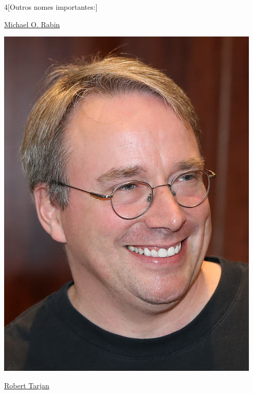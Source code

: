 \begin{multicols}{4}[Outros nomes importantes:]
\vfill\null
\columnbreak				
				
				\href{https://pt.wikipedia.org/wiki/Michael_O._Rabin}{Michael O. Rabin}
				
\begin{center}
					\includegraphics[width=.8\columnwidth]{./IMG-GIT/CIENTISTAS/linus.jpeg}
\end{center}
				
\vfill\null
\columnbreak				
				
				\href{https://pt.wikipedia.org/wiki/Robert_Tarjan}{Robert Tarjan}
				

\end{multicols}
